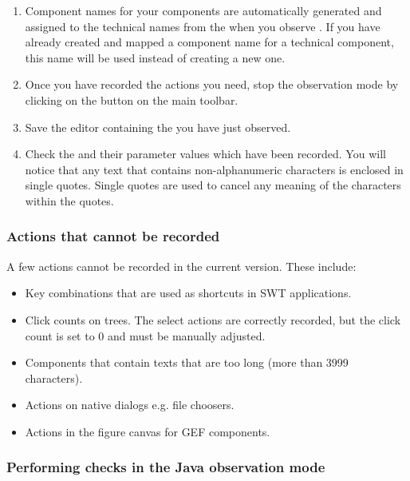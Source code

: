 \begin{enumerate}
\item Component names for your components are automatically generated and assigned to the technical names from the \gdaut{} when you observe \gdsteps{}. If you have already created and mapped a component name for a technical component, this name will be used instead of creating a new one. 
\item Once you have recorded the actions you need, stop the observation mode by clicking on the  button 
on the main toolbar.
\item Save the \gdcase{} editor containing the \gdsteps{} you have just observed. 
\item Check the \gdsteps{} and their parameter values which have been recorded. 
You will notice that any text that contains non-alphanumeric characters is enclosed in single quotes. Single quotes are used  to cancel any meaning of the characters within the quotes. 
\end{enumerate}

\subsubsection{Actions that cannot be recorded}
A few actions cannot be recorded in the current version. These include:
\begin{itemize}
\item Key combinations that are used as shortcuts in SWT applications.
\item Click counts on trees. The select actions are correctly recorded, but the click count is set to 0 and must be manually adjusted. 
\item Components that contain texts that are too long (more than 3999 characters). 
\item Actions on native dialogs e.g. file choosers. 
\item Actions in the figure canvas for GEF components. 
\end{itemize}

\subsubsection{Performing checks in the Java observation mode}
\label{TasksObsCheckJava}

